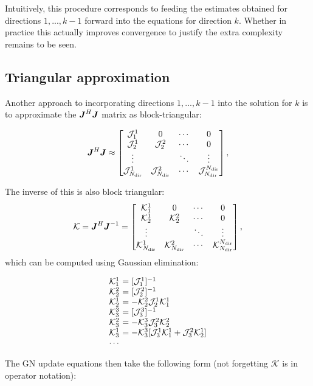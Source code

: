 \documentclass[useAMS,usenatbib]{mn2e}
\newcommand{\mat}[1]{{\bmath{#1}}}
\newcommand{\JJ}{\mat{J}} %
\newcommand{\JHJ}{\JJ^H\JJ} %
\begin{document}
Intuitively, this procedure corresponds to feeding the estimates obtained for directions $1,...,k-1$ forward into the 
equations for direction $k$. Whether in practice this actually improves convergence to justify the extra complexity remains to be seen.

\subsection{Triangular approximation}

Another approach to incorporating directions $1,...,k-1$ into the solution for $k$ is to approximate the $\JHJ$ matrix as
block-triangular:

\begin{equation}
\label{eq:JHJ:DD:block-triag}
\JHJ \approx \Matrix{cccc}{
\JJJ^1_1 & 0 & \cdots & 0 \\
\JJJ^1_2 & \JJJ^2_2 & \cdots & 0 \\
\vdots & & \ddots &  \vdots \\
\JJJ_{\Nd}^1 & \JJJ_{\Nd}^2 & \cdots & \JJJ_{\Nd}^{\Nd} },
\end{equation}

\newcommand{\KKK}{\mathcal{K}}

The inverse of this is also block triangular:
\begin{equation}
\label{eq:JHJ:DD:block-triag-inv}
\KKK = \JHJ^{-1} = \Matrix{cccc}{
\KKK^1_1 & 0 & \cdots & 0 \\
\KKK^1_2 & \KKK^2_2 & \cdots & 0 \\
\vdots & & \ddots &  \vdots \\
\KKK_{\Nd}^1 & \KKK_{\Nd}^2 & \cdots & \KKK_{\Nd}^{\Nd} },
\end{equation}
which can be computed using Gaussian elimination:

\[
\begin{array}{l@{~}l}
\KKK^1_1 &= [\JJJ^1_1]^{-1} \\
\KKK^2_2 &= [\JJJ^2_2]^{-1} \\
\KKK^1_2 &= - \KKK^2_2 \JJJ^1_2 \KKK^1_1\\
\KKK^3_3 &= [\JJJ^3_3]^{-1} \\
\KKK^2_3 &= - \KKK^3_3 \JJJ^2_3 \KKK^2_2\\
\KKK^1_3 &= - \KKK^3_3 [ \JJJ^1_3 \KKK^1_1 + \JJJ^2_3 \KKK^1_2  ]\\
\cdots
\end{array}
\]

The GN update equations then take the following form (not forgetting $\KKK$ is in operator notation):
\end{document}
